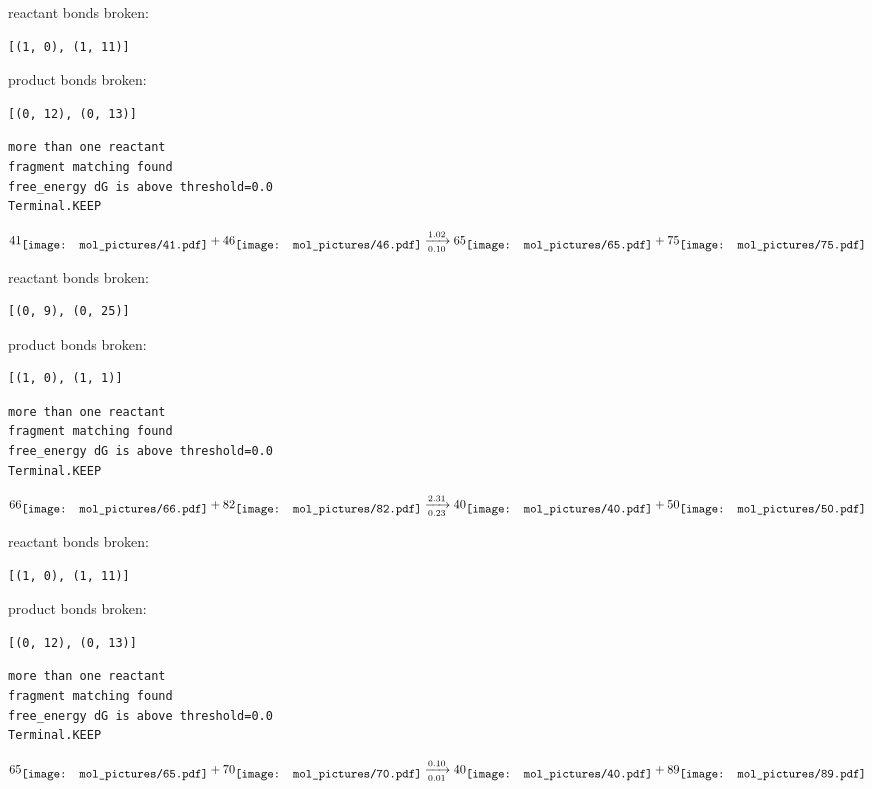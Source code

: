 \documentclass{article}
\begin{document}
reactant bonds broken:\begin{verbatim}
[(1, 0), (1, 11)]
\end{verbatim}
product bonds broken:\begin{verbatim}
[(0, 12), (0, 13)]
\end{verbatim}




\vspace{1cm}
\begin{verbatim}
more than one reactant
fragment matching found
free_energy dG is above threshold=0.0
Terminal.KEEP
\end{verbatim}
$$
41
\raisebox{-.5\height}{\texttt{[image: mol\_pictures/41.pdf]}}
+
46
\raisebox{-.5\height}{\texttt{[image: mol\_pictures/46.pdf]}}
\xrightarrow[0.10]{1.02}
65
\raisebox{-.5\height}{\texttt{[image: mol\_pictures/65.pdf]}}
+
75
\raisebox{-.5\height}{\texttt{[image: mol\_pictures/75.pdf]}}
$$


reactant bonds broken:\begin{verbatim}
[(0, 9), (0, 25)]
\end{verbatim}
product bonds broken:\begin{verbatim}
[(1, 0), (1, 1)]
\end{verbatim}




\vspace{1cm}
\begin{verbatim}
more than one reactant
fragment matching found
free_energy dG is above threshold=0.0
Terminal.KEEP
\end{verbatim}
$$
66
\raisebox{-.5\height}{\texttt{[image: mol\_pictures/66.pdf]}}
+
82
\raisebox{-.5\height}{\texttt{[image: mol\_pictures/82.pdf]}}
\xrightarrow[0.23]{2.31}
40
\raisebox{-.5\height}{\texttt{[image: mol\_pictures/40.pdf]}}
+
50
\raisebox{-.5\height}{\texttt{[image: mol\_pictures/50.pdf]}}
$$


reactant bonds broken:\begin{verbatim}
[(1, 0), (1, 11)]
\end{verbatim}
product bonds broken:\begin{verbatim}
[(0, 12), (0, 13)]
\end{verbatim}




\vspace{1cm}
\begin{verbatim}
more than one reactant
fragment matching found
free_energy dG is above threshold=0.0
Terminal.KEEP
\end{verbatim}
$$
65
\raisebox{-.5\height}{\texttt{[image: mol\_pictures/65.pdf]}}
+
70
\raisebox{-.5\height}{\texttt{[image: mol\_pictures/70.pdf]}}
\xrightarrow[0.01]{0.10}
40
\raisebox{-.5\height}{\texttt{[image: mol\_pictures/40.pdf]}}
+
89
\raisebox{-.5\height}{\texttt{[image: mol\_pictures/89.pdf]}}
$$
\end{document}
